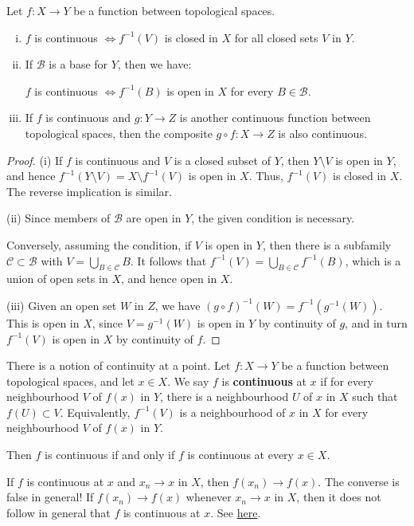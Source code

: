 \documentclass[a4paper,11pt]{article}
\begin{document}
\begin{proposition}\label{prop:4.8}
    Let $f: X \rightarrow Y$ be a function between topological spaces.

    \begin{enumerate}[(i)]
        \item $f$ is continuous $\Longleftrightarrow f^{-1}(V)$ is closed in $X$ for all closed sets $V$ in $Y$.

        \item If $\mathcal{B}$ is a base for $Y$, then we have:
    
        $f$ is continuous $\Longleftrightarrow f^{-1}(B)$ is open in $X$ for every $B \in \mathcal{B}$.
    
        \item If $f$ is continuous and $g: Y \rightarrow Z$ is another continuous function between topological spaces, then the composite $g \circ f: X \rightarrow Z$ is also continuous.
    \end{enumerate}
\end{proposition}
\begin{proof}
    (i) If $f$ is continuous and $V$ is a closed subset of $Y$, then $Y \setminus V$ is open in $Y$, and hence $f^{-1}(Y \setminus V)=X \setminus f^{-1}(V)$ is open in $X$. Thus, $f^{-1}(V)$ is closed in $X$. The reverse implication is similar.
    
    (ii) Since members of $\mathcal{B}$ are open in $Y$, the given condition is necessary.
    
    Conversely, assuming the condition, if $V$ is open in $Y$, then there is a subfamily $\mathcal{C} \subset \mathcal{B}$ with $V=\bigcup_{B \in \mathcal{C}} B$. It follows that $f^{-1}(V)=\bigcup_{B \in \mathcal{C}} f^{-1}(B)$, which is a union of open sets in $X$, and hence open in $X$.
    
    (iii) Given an open set $W$ in $Z$, we have $(g \circ f)^{-1}(W)=f^{-1}\left(g^{-1}(W)\right)$. This is open in $X$, since $V=g^{-1}(W)$ is open in $Y$ by continuity of $g$, and in turn $f^{-1}(V)$ is open in $X$ by continuity of $f$.
\end{proof}

\begin{remark}
    There is a notion of continuity at a point. Let $f: X \rightarrow Y$ be a function between topological spaces, and let $x \in X$. We say $f$ is \textbf{continuous} at $x$ if for every neighbourhood $V$ of $f(x)$ in $Y$, there is a neighbourhood $U$ of $x$ in $X$ such that $f(U) \subset V$. Equivalently, $f^{-1}(V)$ is a neighbourhood of $x$ in $X$ for every neighbourhood $V$ of $f(x)$ in $Y$.

    Then $f$ is continuous if and only if $f$ is continuous at every $x \in X$.

    If $f$ is continuous at $x$ and $x_{n} \rightarrow x$ in $X$, then $f\left(x_{n}\right) \rightarrow f(x)$. The converse is false in general! If $f\left(x_{n}\right) \rightarrow f(x)$ whenever $x_{n} \rightarrow x$ in $X$, then it does not follow in general that $f$ is continuous at $x$. See \href{https://math.stackexchange.com/questions/1419938/example-of-topological-spaces-where-sequential-continuity-does-not-imply-continu}{here}. 
\end{remark}
\end{document}
